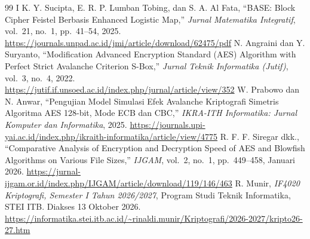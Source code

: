 \begin{thebibliography}{99}
   I K. Y. Sucipta, E. R. P. Lumban Tobing, dan S. A. Al Fata, ``BASE: Block Cipher Feistel Berbasis Enhanced Logistic Map,'' \textit{Jurnal Matematika Integratif}, vol.~21, no.~1, pp.~41--54, 2025. \url{https://journals.unpad.ac.id/jmi/article/download/62475/pdf}
   N. Angraini dan Y. Suryanto, ``Modification Advanced Encryption Standard (AES) Algorithm with Perfect Strict Avalanche Criterion S-Box,'' \textit{Jurnal Teknik Informatika (Jutif)}, vol.~3, no.~4, 2022. \url{https://jutif.if.unsoed.ac.id/index.php/jurnal/article/view/352}
   W. Prabowo dan N. Anwar, ``Pengujian Model Simulasi Efek Avalanche Kriptografi Simetris Algoritma AES 128-bit, Mode ECB dan CBC,'' \textit{IKRA-ITH Informatika: Jurnal Komputer dan Informatika}, 2025. \url{https://journals.upi-yai.ac.id/index.php/ikraith-informatika/article/view/4775}
   R. F. F. Siregar dkk., ``Comparative Analysis of Encryption and Decryption Speed of AES and Blowfish Algorithms on Various File Sizes,'' \textit{IJGAM}, vol.~2, no.~1, pp.~449--458, Januari 2026. \url{https://jurnal-ijgam.or.id/index.php/IJGAM/article/download/119/146/463}
   R. Munir, \textit{IF4020 Kriptografi, Semester I Tahun 2026/2027}, Program Studi Teknik Informatika, STEI ITB. Diakses 13 Oktober 2026. \url{https://informatika.stei.itb.ac.id/~rinaldi.munir/Kriptografi/2026-2027/kripto26-27.htm}
\end{thebibliography}

